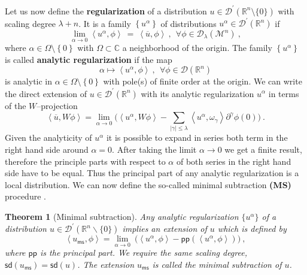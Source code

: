 \documentclass[11pt]{book}
\newcommand{\pp}{\mathsf{pp}}
\newcommand{\ms}{\mathsf{ms}}
\newcommand{\sd}{\mathsf{sd}}
\newcommand{\abs}[1]{\left|#1\right|}
\newcommand{\sm}[1]{\left\langle#1\right\rangle}
\newcommand{\Dcal}{\mathcal{D}}
\newcommand{\Mcal}{\mathcal{M}}
\newcommand{\Rbb}{\mathbb{R}}
\theoremstyle{break}
\newtheorem{theorem}{Theorem}[chapter]
\begin{document}
Let us now define the \textbf{regularization} of a distribution $u \in \Dcal^\prime(\Rbb^n\setminus \{0\})$ with scaling degree $\lambda+n$. It is a family $\left\{ u^{\alpha}\right\}$ of distributions $u^{\alpha}\in\Dcal^\prime(\Rbb^n)$ if
%
\begin{equation*}
\lim_{\alpha \to 0} \sm{u^{\alpha},\phi} \ = \ \sm{\overline{u},\phi} \ , \ \ \forall \phi \in \Dcal_{\lambda}(\Mcal^n) \ , 
\end{equation*}
%
where $\alpha \in \Omega\setminus\left\{ 0\right\}$ with $\Omega\subset\mathbb{C}$ a neighborhood of the origin. The family $\left\{ u^{\alpha}\right\}$ is called \textbf{analytic regularization} if the map 
% 
\begin{equation*}
\alpha \mapsto \sm{u^{\alpha},\phi} \ , \ \ \forall \phi \in \Dcal(\Rbb^n)
\end{equation*}
%
is analytic in $\alpha\in\Omega\setminus\left\{ 0\right\}$ with pole(s) of finite order at the origin. We can write the direct extension of $u\in\Dcal^\prime(\Rbb^n)$ with its analytic regularization $u^\alpha$ in terms of the $W$--projection
%
\begin{equation*}
\sm{\overline{u} , W \phi} = \lim_{\alpha \to 0} \bigg( \sm{u^\alpha , W \phi} -  \sum_{\abs{\gamma}\leq\lambda} \sm{ u^\alpha , \omega_\gamma } \partial^\gamma \phi(0) \bigg) \ .
\end{equation*}
% 
Given the analyticity of $u^\alpha$ it is possible to expand in series both term in the right hand side around $\alpha=0$. After taking the limit $\alpha \to 0$ we get a finite result, therefore the principle parts with respect to $\alpha$ of both series in the right hand side have to be equal. Thus the principal part of any analytic regularization is a local distribution. We can now define the so-called minimal subtraction \textbf{(MS)} procedure \cite{DFKR_2014}.


\begin{theorem}[Minimal subtraction]\label{theo:ms_mumeric}
Any analytic regularization $\{u^\alpha\}$ of a distribution $u \in \Dcal^\prime(\Rbb^n \backslash \{0\})$ implies an extension of $u$ which is defined by 
%
\begin{equation*}
\sm{u_\ms,\phi} = \lim_{\alpha \to 0} \ \bigg( \sm{u^\alpha , \phi} - \pp\left(\sm{u^\alpha , \phi}\right) \bigg) \ ,
\end{equation*}
%
where $\pp$ is the principal part. We require the same scaling degree, $\sd(u_\ms) = \sd(u)$. The extension $u_\ms$ is called the minimal subtraction of $u$.
\end{theorem}
\end{document}
